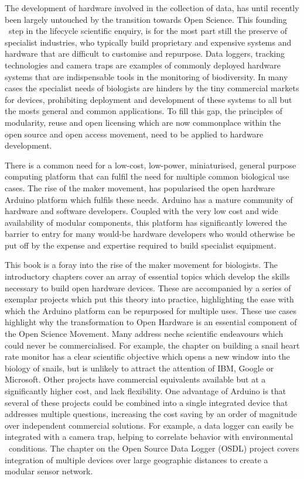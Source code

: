 \documentclass[
]{book}
\begin{document}
The development of hardware involved in the collection of data, has until recently been largely untouched by the transition towards Open Science. This founding ~step in the lifecycle scientific enquiry, is for the most part still the preserve of specialist industries, who typically build proprietary and expensive systems and hardware that are difficult to customise and repurpose. Data loggers, tracking technologies and camera traps are examples of commonly deployed hardware systems that are indispensable tools in the monitoring of biodiversity. In many cases the specialist needs of biologists are hinders by the tiny commercial markets for devices, prohibiting deployment and development of these systems to all but the mosts general and common applications. To fill this gap, the principles of modularity, reuse and open licensing which are now commonplace within the open source and open access movement, need to be applied to hardware development.

There is a common need for a low-cost, low-power, miniaturised, general purpose computing platform that can fulfil the need for multiple common biological use cases. The rise of the maker movement, has popularised the open hardware Arduino platform which fulfils these needs. Arduino has a mature community of hardware and software developers. Coupled with the very low cost and wide availability of modular components, this platform has significantly lowered the barrier to entry for many would-be hardware developers who would otherwise be put off by the expense and expertise required to build specialist equipment.

This book is a foray into the rise of the maker movement for biologists. The introductory chapters cover an array of essential topics which develop the skills necessary to build open hardware devices. These are accompanied by a series of exemplar projects which put this theory into practice, highlighting the ease with which the Arduino platform can be repurposed for multiple uses. These use cases highlight why the transformation to Open Hardware is an essential component of the Open Science Movement. Many address neche scientific endeavours which could never be commercialised. For example, the chapter on building a snail heart rate monitor has a clear scientific objective which opens a new window into the biology of snails, but is unlikely to attract the attention of IBM, Google or Microsoft. Other projects have commercial equivalents available but at a significantly higher cost, and lack flexibility. One advantage of Arduino is that several of these projects could be combined into a single integrated device that addresses multiple questions, increasing the cost saving by an order of magnitude over independent commercial solutions. For example, a data logger can easily be integrated with a camera trap, helping to correlate behavior with environmental ~conditions. The chapter on the Open Source Data Logger (OSDL) project covers integration of multiple devices over large geographic distances to create a modular sensor network.
\end{document}
